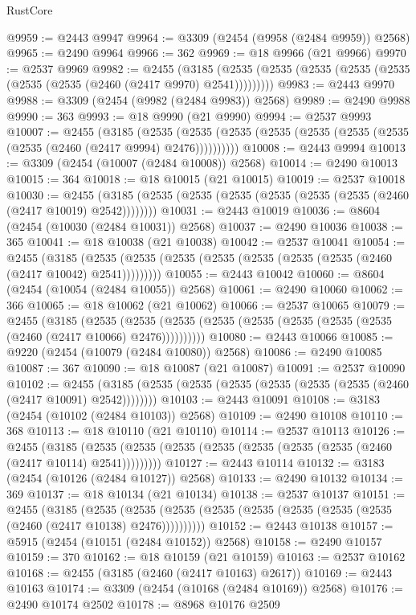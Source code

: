 \begin{lexlean}{RustCore}
\begin{coremodule}
@9959 := @2443 @9947
@9964 := @3309 (@2454 (@9958 (@2484 @9959)) @2568)
@9965 := @2490 @9964
@9966 := 362
@9969 := @18 @9966 (@21 @9966)
@9970 := @2537 @9969
@9982 := @2455
    (@3185 (@2535 (@2535 (@2535 (@2535 (@2535 (@2535 (@2535 (@2460 (@2417 @9970) @2541)))))))))
@9983 := @2443 @9970
@9988 := @3309 (@2454 (@9982 (@2484 @9983)) @2568)
@9989 := @2490 @9988
@9990 := 363
@9993 := @18 @9990 (@21 @9990)
@9994 := @2537 @9993
@10007 := @2455
    (@3185
      (@2535 (@2535 (@2535 (@2535 (@2535 (@2535 (@2535 (@2535 (@2460 (@2417 @9994) @2476))))))))))
@10008 := @2443 @9994
@10013 := @3309 (@2454 (@10007 (@2484 @10008)) @2568)
@10014 := @2490 @10013
@10015 := 364
@10018 := @18 @10015 (@21 @10015)
@10019 := @2537 @10018
@10030 := @2455 (@3185 (@2535 (@2535 (@2535 (@2535 (@2535 (@2535 (@2460 (@2417 @10019) @2542))))))))
@10031 := @2443 @10019
@10036 := @8604 (@2454 (@10030 (@2484 @10031)) @2568)
@10037 := @2490 @10036
@10038 := 365
@10041 := @18 @10038 (@21 @10038)
@10042 := @2537 @10041
@10054 := @2455
    (@3185 (@2535 (@2535 (@2535 (@2535 (@2535 (@2535 (@2535 (@2460 (@2417 @10042) @2541)))))))))
@10055 := @2443 @10042
@10060 := @8604 (@2454 (@10054 (@2484 @10055)) @2568)
@10061 := @2490 @10060
@10062 := 366
@10065 := @18 @10062 (@21 @10062)
@10066 := @2537 @10065
@10079 := @2455
    (@3185
      (@2535 (@2535 (@2535 (@2535 (@2535 (@2535 (@2535 (@2535 (@2460 (@2417 @10066) @2476))))))))))
@10080 := @2443 @10066
@10085 := @9220 (@2454 (@10079 (@2484 @10080)) @2568)
@10086 := @2490 @10085
@10087 := 367
@10090 := @18 @10087 (@21 @10087)
@10091 := @2537 @10090
@10102 := @2455 (@3185 (@2535 (@2535 (@2535 (@2535 (@2535 (@2535 (@2460 (@2417 @10091) @2542))))))))
@10103 := @2443 @10091
@10108 := @3183 (@2454 (@10102 (@2484 @10103)) @2568)
@10109 := @2490 @10108
@10110 := 368
@10113 := @18 @10110 (@21 @10110)
@10114 := @2537 @10113
@10126 := @2455
    (@3185 (@2535 (@2535 (@2535 (@2535 (@2535 (@2535 (@2535 (@2460 (@2417 @10114) @2541)))))))))
@10127 := @2443 @10114
@10132 := @3183 (@2454 (@10126 (@2484 @10127)) @2568)
@10133 := @2490 @10132
@10134 := 369
@10137 := @18 @10134 (@21 @10134)
@10138 := @2537 @10137
@10151 := @2455
    (@3185
      (@2535 (@2535 (@2535 (@2535 (@2535 (@2535 (@2535 (@2535 (@2460 (@2417 @10138) @2476))))))))))
@10152 := @2443 @10138
@10157 := @5915 (@2454 (@10151 (@2484 @10152)) @2568)
@10158 := @2490 @10157
@10159 := 370
@10162 := @18 @10159 (@21 @10159)
@10163 := @2537 @10162
@10168 := @2455 (@3185 (@2460 (@2417 @10163) @2617))
@10169 := @2443 @10163
@10174 := @3309 (@2454 (@10168 (@2484 @10169)) @2568)
@10176 := @2490 @10174 @2502
@10178 := @8968 @10176 @2509

\end{coremodule}
\end{lexlean}
